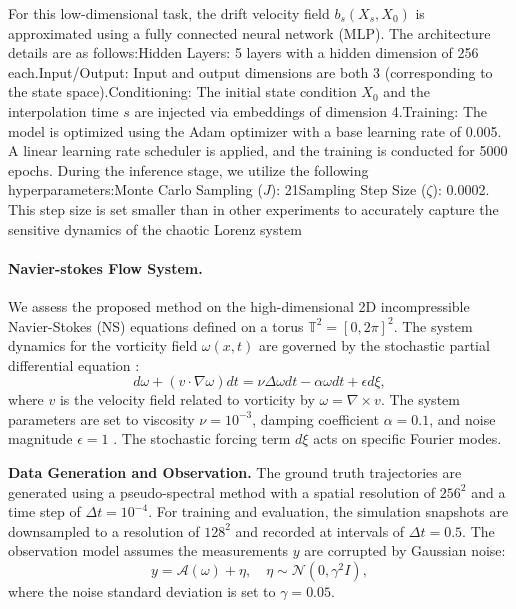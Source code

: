 \documentclass{article}
\theoremstyle{plain}
\theoremstyle{definition}
\theoremstyle{remark}
\begin{document}
For this low-dimensional task, the drift velocity field $b_s(X_s, X_0)$ is approximated using a fully connected neural network (MLP). The architecture details are as follows:Hidden Layers: 5 layers with a hidden dimension of 256 each.Input/Output: Input and output dimensions are both 3 (corresponding to the state space).Conditioning: The initial state condition $X_0$ and the interpolation time $s$ are injected via embeddings of dimension 4.Training:
The model is optimized using the Adam optimizer with a base learning rate of 0.005. A linear learning rate scheduler is applied, and the training is conducted for 5000 epochs. During the inference stage, we utilize the following hyperparameters:Monte Carlo Sampling ($J$): 21Sampling Step Size ($\zeta$): 0.0002. This step size is set smaller than in other experiments to accurately capture the sensitive dynamics of the chaotic Lorenz system
\paragraph{Navier-stokes Flow System.}
We assess the proposed method on the high-dimensional 2D incompressible Navier-Stokes (NS) equations defined on a torus $\mathbb{T}^2=[0, 2\pi]^2$. The system dynamics for the vorticity field $\omega(x, t)$ are governed by the stochastic partial differential equation :
\begin{equation}
d\omega + (v \cdot \nabla \omega) dt = \nu \Delta \omega dt - \alpha \omega dt + \epsilon d\xi,
\end{equation}
where $v$ is the velocity field related to vorticity by $\omega = \nabla \times v$. The system parameters are set to viscosity $\nu=10^{-3}$, damping coefficient $\alpha=0.1$, and noise magnitude $\epsilon=1$ . The stochastic forcing term $d\xi$ acts on specific Fourier modes.

\textbf{Data Generation and Observation.} The ground truth trajectories are generated using a pseudo-spectral method with a spatial resolution of $256^2$ and a time step of $\Delta t=10^{-4}$. For training and evaluation, the simulation snapshots are downsampled to a resolution of $128^2$ and recorded at intervals of $\Delta t=0.5$. The observation model assumes the measurements $y$ are corrupted by Gaussian noise:
\begin{equation}
y = \mathcal{A}(\omega) + \eta, \quad \eta \sim \mathcal{N}(0, \gamma^2 I),
\end{equation}
where the noise standard deviation is set to $\gamma=0.05$.
\end{document}

